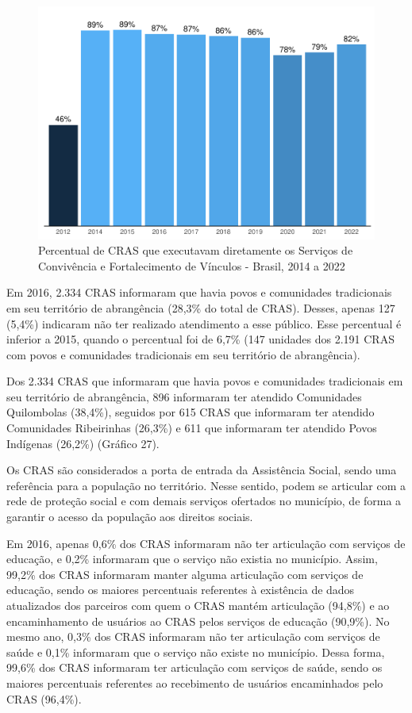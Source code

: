 \documentclass[
  brazilian]{report}
\begin{document}
\begin{figure}
\includegraphics{Censo-SUAS-2022_files/figure-latex/CRAS-SCFV-1} \caption[Percentual de CRAS que executavam diretamente os Serviços de Convivência e Fortalecimento de Vínculos - Brasil, 2014 a 2022]{Percentual de CRAS que executavam diretamente os Serviços de Convivência e Fortalecimento de Vínculos - Brasil, 2014 a 2022}\label{fig:CRAS-SCFV}
\end{figure}

Em 2016, 2.334 CRAS informaram que havia povos e comunidades
tradicionais em seu território de abrangência (28,3\% do total de CRAS).
Desses, apenas 127 (5,4\%) indicaram não ter realizado atendimento a
esse público. Esse percentual é inferior a 2015, quando o percentual foi
de 6,7\% (147 unidades dos 2.191 CRAS com povos e comunidades
tradicionais em seu território de abrangência).

Dos 2.334 CRAS que informaram que havia povos e comunidades tradicionais
em seu território de abrangência, 896 informaram ter atendido
Comunidades Quilombolas (38,4\%), seguidos por 615 CRAS que informaram
ter atendido Comunidades Ribeirinhas (26,3\%) e 611 que informaram ter
atendido Povos Indígenas (26,2\%) (Gráfico 27).

Os CRAS são considerados a porta de entrada da Assistência Social, sendo
uma referência para a população no território. Nesse sentido, podem se
articular com a rede de proteção social e com demais serviços ofertados
no município, de forma a garantir o acesso da população aos direitos
sociais.

Em 2016, apenas 0,6\% dos CRAS informaram não ter articulação com
serviços de educação, e 0,2\% informaram que o serviço não existia no
município. Assim, 99,2\% dos CRAS informaram manter alguma articulação
com serviços de educação, sendo os maiores percentuais referentes à
existência de dados atualizados dos parceiros com quem o CRAS mantém
articulação (94,8\%) e ao encaminhamento de usuários ao CRAS pelos
serviços de educação (90,9\%). No mesmo ano, 0,3\% dos CRAS informaram
não ter articulação com serviços de saúde e 0,1\% informaram que o
serviço não existe no município. Dessa forma, 99,6\% dos CRAS informaram
ter articulação com serviços de saúde, sendo os maiores percentuais
referentes ao recebimento de usuários encaminhados pelo CRAS (96,4\%).
\end{document}
